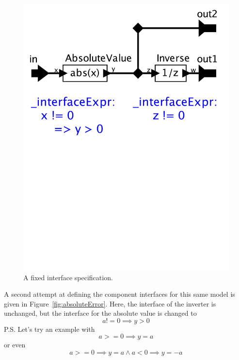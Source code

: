 \documentclass[preprint,11pt]{sigplanconf}
\begin{document}
\begin{figure}[htbp]
\centering
\includegraphics[width=\columnwidth]{figs/absoluteCorrected}
\caption{A fixed interface specification.}
\label{fig:absoluteCorrected}
\end{figure}

A second attempt at defining the component interfaces for this same model is
given in Figure~\ref{fig:absoluteError}.
Here, the interface of the inverter is unchanged,
but the interface for the absolute value is changed to \[
a != 0 \implies y > 0
\]
P.S. Let's try an example with \[ a >= 0 \implies y = a\] or even \[a >= 0
\implies y = a  \wedge a < 0 \implies y = -a\]
\end{document}
